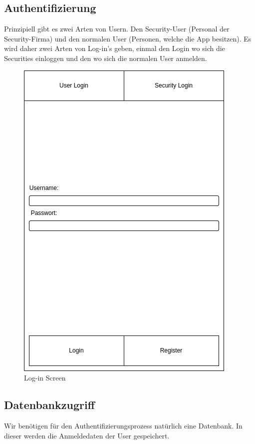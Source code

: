 \documentclass{article}
\begin{document}
\subsection{Authentifizierung}
Prinzipiell gibt es zwei Arten von Usern. Den Security-User (Personal der Security-Firma) und den normalen User (Personen, welche die App besitzen). Es wird daher zwei Arten von Log-in's geben, einmal den Login wo sich die Securities einloggen und den wo sich die normalen User anmelden. 
\begin{figure}[H] \includegraphics[scale=0.75]{login} \centering \caption{Log-in Screen} \end{figure}
\subsection{Datenbankzugriff}
Wir benötigen für den Authentifizierungsprozess natürlich eine Datenbank. In dieser werden die Anmeldedaten der User gespeichert.
\end{document}
